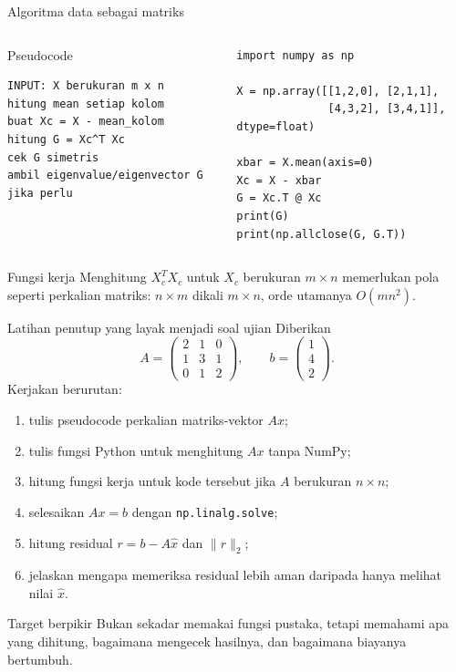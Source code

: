 \documentclass[aspectratio=169,11pt]{beamer}
\begin{document}
\begin{frame}[fragile]{Algoritma data sebagai matriks}
\begin{columns}[T]
\begin{block}{Pseudocode}
\scriptsize
\begin{verbatim}
INPUT: X berukuran m x n
hitung mean setiap kolom
buat Xc = X - mean_kolom
hitung G = Xc^T Xc
cek G simetris
ambil eigenvalue/eigenvector G jika perlu
\end{verbatim}
\end{block}
\pause
{}
\begin{lstlisting}
import numpy as np

X = np.array([[1,2,0], [2,1,1],
              [4,3,2], [3,4,1]], dtype=float)

xbar = X.mean(axis=0)
Xc = X - xbar
G = Xc.T @ Xc
print(G)
print(np.allclose(G, G.T))
\end{lstlisting}
\end{columns}
\vspace{1mm}
\begin{alertblock}{Fungsi kerja}
Menghitung $X_c^T X_c$ untuk $X_c$ berukuran $m\times n$ memerlukan pola seperti perkalian matriks: $n\times m$ dikali $m\times n$, orde utamanya $O(mn^2)$.
\end{alertblock}
\end{frame}

\begin{frame}{Latihan penutup yang layak menjadi soal ujian}
\small
Diberikan
\[
A=\begin{pmatrix}2&1&0\\1&3&1\\0&1&2\end{pmatrix},\qquad
b=\begin{pmatrix}1\\4\\2\end{pmatrix}.
\]
Kerjakan berurutan:
\begin{enumerate}\small
  \item tulis pseudocode perkalian matriks-vektor $Ax$;
  \item tulis fungsi Python untuk menghitung $Ax$ tanpa NumPy;
  \item hitung fungsi kerja untuk kode tersebut jika $A$ berukuran $n\times n$;
  \item selesaikan $Ax=b$ dengan \texttt{np.linalg.solve};
  \item hitung residual $r=b-A\hat{x}$ dan $\|r\|_2$;
  \item jelaskan mengapa memeriksa residual lebih aman daripada hanya melihat nilai $\hat{x}$.
\end{enumerate}

\begin{alertblock}{Target berpikir}
\footnotesize
Bukan sekadar memakai fungsi pustaka, tetapi memahami apa yang dihitung, bagaimana mengecek hasilnya, dan bagaimana biayanya bertumbuh.
\end{alertblock}
\end{frame}
\end{document}
